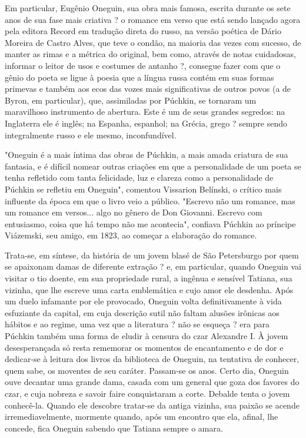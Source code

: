 Em particular, Eugênio Oneguin, sua obra mais famosa, escrita durante os
sete anos de sua fase mais criativa ? o romance em verso que está sendo
lançado agora pela editora Record em tradução direta do russo, na versão
poética de Dário Moreira de Castro Alves, que teve o condão, na maioria
das vezes com sucesso, de manter as rimas e a métrica do original, bem
como, através de notas cuidadosas, informar o leitor de usos e costumes
de antanho ?, consegue fazer com que o gênio do poeta se ligue à poesia
que a língua russa contém em suas formas primevas e também aos ecos das
vozes mais significativas de outros povos (a de Byron, em particular),
que, assimiladas por Púchkin, se tornaram um maravilhoso instrumento de
abertura. Este é um de seus grandes segredos: na Inglaterra ele é
inglês; na Espanha, espanhol; na Grécia, grego ? sempre sendo
integralmente russo e ele mesmo, inconfundível.

"Oneguin é a mais íntima das obras de Púchkin, a mais amada criatura de
sua fantasia, e é difícil nomear outras criações em que a personalidade
de um poeta se tenha refletido com tanta felicidade, luz e clareza como
a personalidade de Púchkin se refletiu em Oneguin", comentou Vissarion
Belínski, o crítico mais influente da época em que o livro veio a
público. "Escrevo não um romance, mas um romance em versos... algo no
gênero de Don Giovanni. Escrevo com entusiasmo, coisa que há tempo não
me acontecia", confiava Púchkin ao príncipe Viázemski, seu amigo, em
1823, ao começar a elaboração do romance.

Trata-se, em síntese, da história de um jovem blasé de São Petersburgo
por quem se apaixonam damas de diferente extração ? e, em particular,
quando Oneguin vai visitar o tio doente, em sua propriedade rural, a
ingênua e sensível Tatiana, sua vizinha, que lhe escreve uma carta
emblemática e cujo amor ele desdenha. Após um duelo infamante por ele
provocado, Oneguin volta definitivamente à vida esfuziante da capital,
em cuja descrição sutil não faltam alusões irônicas aos hábitos e ao
regime, uma vez que a literatura ? não se esqueça ? era para Púchkin
também uma forma de eludir à censura do czar Alexandre I. À jovem
desesperançada só resta rememorar os momentos de encantamento e de dor e
dedicar-se à leitura dos livros da biblioteca de Oneguin, na tentativa
de conhecer, quem sabe, os moventes de seu caráter. Passam-se os anos.
Certo dia, Oneguin ouve decantar uma grande dama, casada com um general
que goza dos favores do czar, e cuja nobreza e savoir faire conquistaram
a corte. Debalde tenta o jovem conhecê-la. Quando ele descobre tratar-se
da antiga vizinha, sua paixão se acende irremediavelmente, mormente
quando, após um encontro que ela, afinal, lhe concede, fica Oneguin
sabendo que Tatiana sempre o amara.

